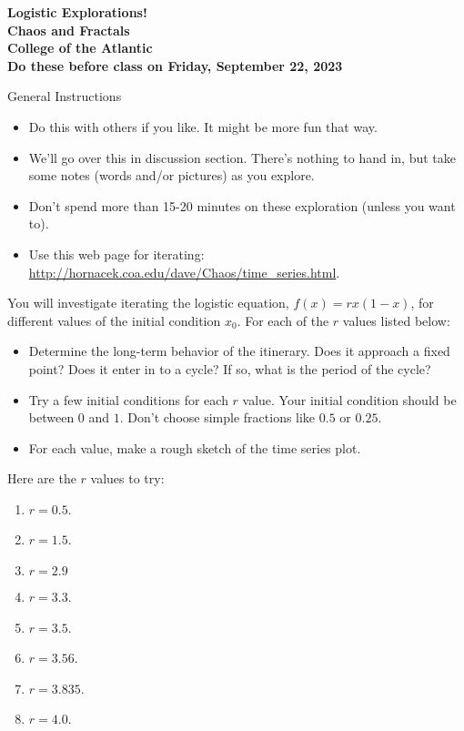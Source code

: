 \documentclass[12pt]{article}
\begin{document}
\pagestyle{empty}
 
\begin{center}
{\LARGE {\bf Logistic Explorations!}}\\
\bigskip
{\Large {\bf Chaos and Fractals}}\\
\bigskip
{\Large {\bf College of the Atlantic}}\\
\bigskip
    {{\bf Do these before class on Friday, September 22, 2023}}\\ 
\end{center}
\medskip

\noindent General Instructions

\begin{itemize}
\setlength{\itemsep}{0mm}
\item Do this with others if you like. It might be more fun that
  way.
\item We'll go over this in discussion section. There's nothing to
  hand in, but take some notes (words and/or pictures) as you
  explore.
\item Don't spend more than 15-20 minutes on these exploration (unless
  you want to).
  \item Use this web page for iterating:
\href{http://hornacek.coa.edu/dave/Chaos/time_series.html}{\url{http://hornacek.coa.edu/dave/Chaos/time_series.html}}.
\end{itemize}


\noindent You will investigate iterating the logistic equation, $f(x)
= rx(1-x)$, for different values of the initial condition $x_0$.  For
each of the $r$ values listed below:
\begin{itemize}
  \setlength{\itemsep}{0mm}
  \item Determine the long-term behavior of the itinerary. Does it
    approach a fixed point?  Does it enter in to a cycle?  If so, what
    is the period of the cycle?
  \item Try a few initial conditions for each $r$ value.  Your initial
    condition should be between $0$ and $1$.  Don't choose simple
    fractions like $0.5$ or $0.25$.
  \item For each value, make a rough sketch of the time series plot.\\
\end{itemize}


\noindent Here are the $r$ values to try:
\begin{enumerate}
\item $r=0.5$.
\item $r=1.5$.
\item $r=2.9$ 
\item $r=3.3$.
\item $r=3.5$.
\item $r=3.56$.
\item $r=3.835$.
\item $r=4.0$.
\end{enumerate}
\end{document}
